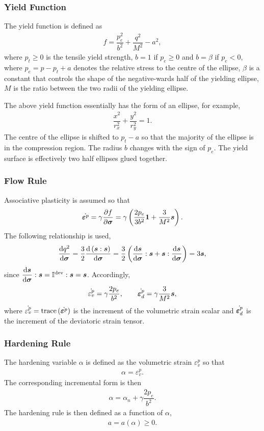 \subsubsection{Yield Function}
The yield function is defined as
\begin{gather}
f=\dfrac{p_e^2}{b^2}+\dfrac{q^2}{M^2}-a^2,
\end{gather}
where $p_t\geqslant0$ is the tensile yield strength, $b=1$ if $p_e\geqslant0$ and $b=\beta$ if $p_e<0$, where $p_e=p-p_t+a$ denotes the relative stress to the centre of the ellipse, $\beta$ is a constant that controls the shape of the negative-wards half of the yielding ellipse, $M$ is the ratio between the two radii of the yielding ellipse.

The above yield function essentially has the form of an ellipse, for example,
\begin{gather*}
\dfrac{x^2}{r_x^2}+\dfrac{y^2}{r_y^2}=1.
\end{gather*}
The centre of the ellipse is shifted to $p_t-a$ so that the majority of the ellipse is in the compression region.
The radius $b$ changes with the sign of $p_e$.
The yield surface is effectively two half ellipses glued together.
\subsubsection{Flow Rule}
Associative plasticity is assumed so that
\begin{gather}
\dot{\bm{\varepsilon}^p}=\gamma\dfrac{\partial{f}}{\partial{\bm{\sigma}}}=\gamma\left(\dfrac{2p_e}{3b^2}\bm{1}+\dfrac{3}{M^2}\bm{s}\right).
\end{gather}
The following relationship is used,
\begin{gather*}
\dfrac{\mathrm{d}q^2}{\mathrm{d}\bm{\sigma}}=\dfrac{3}{2}\dfrac{\mathrm{d}\left(\bm{s}:\bm{s}\right)}{\mathrm{d}\bm{\sigma}}=\dfrac{3}{2}\left(\dfrac{\mathrm{d}\bm{s}}{\mathrm{d}\bm{\sigma}}:\bm{s}+\bm{s}:\dfrac{\mathrm{d}\bm{s}}{\mathrm{d}\bm{\sigma}}\right)=3\bm{s},
\end{gather*}
since $\dfrac{\mathrm{d}\bm{s}}{\mathrm{d}\bm{\sigma}}:\bm{s}=\mathbb{I}^\text{dev}:\bm{s}=\bm{s}$.
Accordingly,
\begin{gather}
\dot{\varepsilon^p_v}=\gamma\dfrac{2p_e}{b^2},\qquad\dot{\bm{\varepsilon}^p_d}=\gamma\dfrac{3}{M^2}\bm{s},
\end{gather}
where $\dot{\varepsilon^p_v}=\text{trace}\left(\dot{\bm{\varepsilon}^p}\right)$ is the increment of the volumetric strain scalar and $\dot{\bm{\varepsilon}^p_d}$ is the increment of the deviatoric strain tensor.
\subsubsection{Hardening Rule}
The hardening variable $\alpha$ is defined as the volumetric strain $\varepsilon^p_v$ so that
\begin{gather}
\alpha=\varepsilon^p_v.
\end{gather}
The corresponding incremental form is then
\begin{gather}
\alpha=\alpha_n+\gamma\dfrac{2p_e}{b^2}.
\end{gather}
The hardening rule is then defined as a function of $\alpha$,
\begin{gather}
a=a\left(\alpha\right)\geqslant0.
\end{gather}

